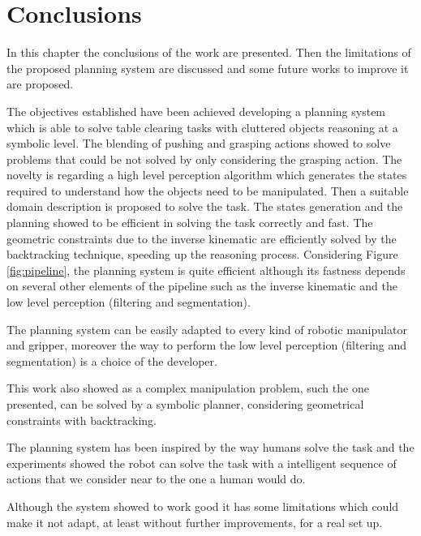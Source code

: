 \chapter{Conclusions}
\label{ch:conclusions}

In this chapter the conclusions of the work are presented. Then the limitations of the proposed planning system are discussed and some future works to improve it are proposed. 

The objectives established have been achieved developing a planning system which is able to solve table clearing tasks with cluttered objects reasoning at a symbolic level. The blending of pushing and grasping actions showed to solve problems that could be not solved by only considering the grasping action. 
The novelty is regarding a high level perception algorithm which generates the states required to understand how the objects need to be manipulated. Then a suitable domain description is proposed to solve the task. The states generation and the planning showed to be efficient in solving the task correctly and fast. 
The geometric constraints due to the inverse kinematic are efficiently solved by the backtracking technique, speeding up the reasoning process. Considering Figure \ref{fig:pipeline}, the planning system is quite efficient although its fastness depends on several other elements of the pipeline such as the inverse kinematic and the low level perception (filtering and segmentation).  

The planning system can be easily adapted to every kind of robotic manipulator and gripper, moreover the way to perform the low level perception (filtering and segmentation) is a choice of the developer.

This work also showed as a complex manipulation problem, such the one presented, can be solved by a symbolic planner, considering geometrical constraints with backtracking. 

The planning system has been inspired by the way humans solve the task and the experiments showed the robot can solve the task with a intelligent sequence of actions that we consider near to the one a human would do.  

Although the system showed to work good it has some limitations which could make it not adapt, at least without further improvements, for a real set up. 


